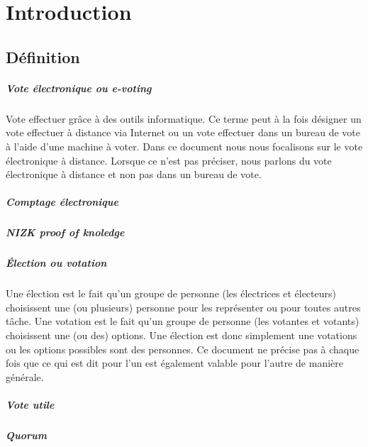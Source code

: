 \documentclass[../report]{subfiles}
\begin{document}
  \chapter{Introduction}

  \section{Définition}

  \paragraph{Vote électronique ou e-voting}
  Vote effectuer grâce à des outils informatique.
  Ce terme peut à la fois désigner un vote effectuer à distance via Internet ou un vote effectuer
  dans un bureau de vote à l'aide d'une machine à voter.
  Dans ce document nous nous focalisons sur le vote électronique à distance.
  Lorsque ce n'est pas préciser, nous parlons du vote électronique à distance et non pas dans un bureau de vote.

  \paragraph{Comptage électronique}
  \todo{}
  
  \paragraph{NIZK proof of knoledge}
  \todo{}

  \paragraph{Élection ou votation}
  Une élection est le fait qu'un groupe de personne (les électrices et électeurs) choisissent une (ou plusieurs) personne
  pour les représenter ou pour toutes autres tâche.
  Une votation est le fait qu'un groupe de personne (les votantes et votants) choisissent une (ou des) options.
  Une élection est donc simplement une votations ou les options possibles sont des personnes.
  Ce document ne précise pas à chaque fois que ce qui est dit pour l'un est également valable pour l'autre de 
  manière générale.

  \paragraph{Vote utile}
  \todo{}
  \paragraph{Quorum}
  \todo{}
\end{document}
